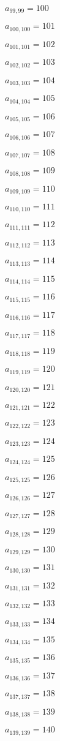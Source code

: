 \documentclass[a4paper,12pt]{article}
\begin{document}
$a _{ 99, 99 } = 100$

$a _{ 100, 100 } = 101$

$a _{ 101, 101 } = 102$

$a _{ 102, 102 } = 103$

$a _{ 103, 103 } = 104$

$a _{ 104, 104 } = 105$

$a _{ 105, 105 } = 106$

$a _{ 106, 106 } = 107$

$a _{ 107, 107 } = 108$

$a _{ 108, 108 } = 109$

$a _{ 109, 109 } = 110$

$a _{ 110, 110 } = 111$

$a _{ 111, 111 } = 112$

$a _{ 112, 112 } = 113$

$a _{ 113, 113 } = 114$

$a _{ 114, 114 } = 115$

$a _{ 115, 115 } = 116$

$a _{ 116, 116 } = 117$

$a _{ 117, 117 } = 118$

$a _{ 118, 118 } = 119$

$a _{ 119, 119 } = 120$

$a _{ 120, 120 } = 121$

$a _{ 121, 121 } = 122$

$a _{ 122, 122 } = 123$

$a _{ 123, 123 } = 124$

$a _{ 124, 124 } = 125$

$a _{ 125, 125 } = 126$

$a _{ 126, 126 } = 127$

$a _{ 127, 127 } = 128$

$a _{ 128, 128 } = 129$

$a _{ 129, 129 } = 130$

$a _{ 130, 130 } = 131$

$a _{ 131, 131 } = 132$

$a _{ 132, 132 } = 133$

$a _{ 133, 133 } = 134$

$a _{ 134, 134 } = 135$

$a _{ 135, 135 } = 136$

$a _{ 136, 136 } = 137$

$a _{ 137, 137 } = 138$

$a _{ 138, 138 } = 139$

$a _{ 139, 139 } = 140$
\end{document}
